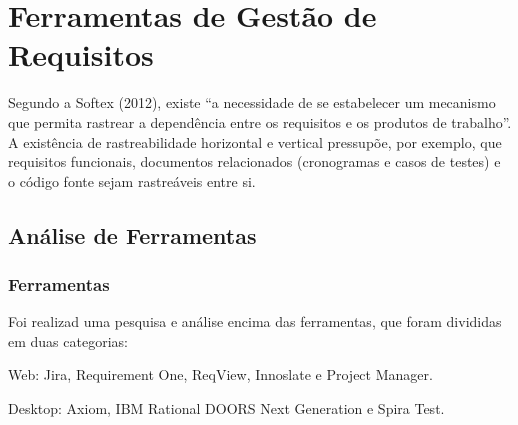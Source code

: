 \chapter[Ferramentas de Gestão de Requisitos]{Ferramentas de Gestão de Requisitos}\label{cap1}


Segundo a Softex (2012), existe “a necessidade de se estabelecer um mecanismo que permita
rastrear a dependência entre os requisitos e os produtos de trabalho”.
A existência de rastreabilidade horizontal e vertical pressupõe, por exemplo,
que requisitos funcionais, documentos relacionados (cronogramas e casos de testes) e o
código fonte sejam rastreáveis entre si.

\section{Análise de Ferramentas}
\subsection{Ferramentas}

Foi
realizad uma pesquisa e análise encima das ferramentas, que foram divididas em duas categorias:
\begin{description}
  \item Web: Jira, Requirement One, ReqView, Innoslate e Project Manager.
  \item Desktop: Axiom, IBM Rational DOORS Next Generation e Spira Test.
\end{description}

